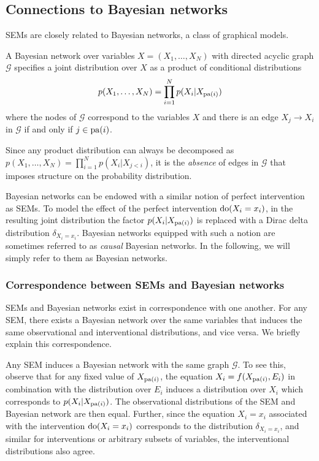 \subsection{Connections to Bayesian networks}

SEMs are closely related to Bayesian networks, a class of graphical models.

\medskip

\begin{definition}
A Bayesian network over variables $X = (X_1,\ldots, X_N)$ with directed acyclic graph $\mathcal{G}$ specifies a joint distribution over $X$ as a product of conditional distributions
\begin{align*}
	p(X_1,\ldots,X_N) = \prod_{i=1}^N p(X_i | X_{\operatorname{pa}(i)})
\end{align*}
where the nodes of $\mathcal{G}$ correspond to the variables $X$ and there is an edge $X_j \to X_i$ in $\mathcal{G}$ if and only if $j \in \operatorname{pa}(i)$.
\end{definition}

Since any product distribution can always be decomposed as $p(X_1,\ldots,X_N) = \prod_{i=1}^N p(X_i | X_{j<i})$, it is the \emph{absence} of edges in $\mathcal{G}$ that imposes structure on the probability distribution.

Bayesian networks can be endowed with a similar notion of perfect intervention as SEMs. To model the effect of the perfect intervention $\operatorname{do}(X_i = x_i)$, in the resulting joint distribution the factor $p(X_i | X_{\operatorname{pa}(i)})$ is replaced with a Dirac delta distribution $\delta_{X_i = x_i}$. 
Bayesian networks equipped with such a notion are sometimes referred to as \emph{causal} Bayesian networks. 
In the following, we will simply refer to them as Bayesian networks.


\subsubsection{Correspondence between SEMs and Bayesian networks} 
SEMs and Bayesian networks exist in correspondence with one another. 
For any SEM, there exists a Bayesian network over the same variables that induces the same observational and interventional distributions, and vice versa.
We briefly explain this correspondence.

Any SEM induces a Bayesian network with the same graph $\mathcal{G}$.
To see this, observe that for any fixed value of $X_{\operatorname{pa}(i)}$, the equation $X_i = f(X_{\operatorname{pa}(i)} , E_i)$ in combination with the distribution over $E_i$ induces a distribution over $X_i$ which corresponds to $p(X_i | X_{\operatorname{pa}(i)})$. The observational distributions of the SEM and Bayesian network are then equal. Further, since the equation $X_i=x_i$ associated with the intervention $\operatorname{do}(X_i = x_i)$ corresponds to the distribution $\delta_{X_i = x_i}$, and similar for interventions or arbitrary subsets of variables, the interventional distributions also agree.

